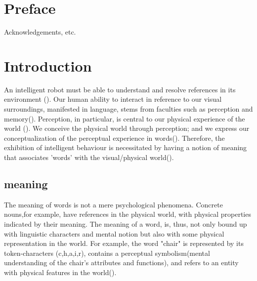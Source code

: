 \documentclass[11pt, a4paper]{article}
\begin{document}
\thispagestyle{empty}

\newpage
\section*{Preface}

Acknowledgements, etc.

\thispagestyle{empty}

\newpage

\begin{spacing}{0.0}
\tableofcontents
\end{spacing}

\thispagestyle{empty}

\newpage
\setcounter{page}{1}

\section{Introduction}
\label{sec:intro}

An intelligent robot must be able to understand and resolve references in its environment (\cite{russell1995artificial}). Our human ability to interact in reference to our visual surroundings, manifested in language, stems from faculties such as perception and memory(\cite{regier1996human}). Perception, in particular, is central to our physical experience of the world (\cite{barsalou1999perceptual}). We conceive the physical world through perception; and we express our conceptualization of the perceptual experience in words(\cite{lakoff2008metaphors}). Therefore, the exhibition of intelligent behaviour is necessitated by having a notion of meaning that associates 'words' with the visual/physical world(\cite{nilsson2007physical}). 

\subsection{meaning}

The  meaning of words is not a mere psychological phenomena. Concrete nouns,for example, have references in the physical world, with physical properties indicated by their meaning. The meaning of a word, is, thus, not only bound up with linguistic characters and mental notion but also with some physical representation in the world. For example, the word "chair" is represented by its token-characters (c,h,a,i,r), contains a perceptual symbolism(mental understanding of the chair's attributes and functions), and refers to an entity with physical features in the world(\cite{mooney}).
\end{document}
